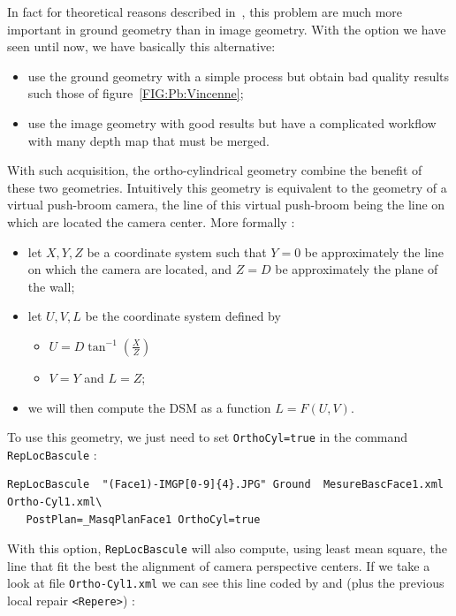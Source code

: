 In fact for theoretical reasons described in~\cite{penard2006reconstruction},
this problem are  much more important in ground geometry than in image geometry.
With the option we have seen until now, we have basically this alternative:

\begin{itemize}
   \item  use the ground geometry with a simple process but obtain bad quality results such those of
          figure~\ref{FIG:Pb:Vincenne};

   \item  use the image geometry with  good results but have a complicated workflow with many depth map
          that must be merged.
\end{itemize}


With such acquisition, the ortho-cylindrical geometry combine the benefit of these
two geometries. Intuitively this geometry is equivalent to the geometry of a virtual push-broom
camera, the line of this virtual push-broom being the line on which are located the
camera center. More formally :


\begin{itemize}
   \item  let  $X,Y,Z$ be a coordinate system such that $Y=0$ be approximately the line on which the camera
          are located, and $Z=D$ be approximately the plane of the wall;

   \item  let  $U,V,L$ be the coordinate system defined by
\begin{itemize}
    \item  $U= D \tan^{-1} (\frac{X}{Z})$
    \item  $V=Y$ and $L=Z$;
\end{itemize}
   \item   we  will then compute the DSM as a function $L= F(U,V)$.
\end{itemize}

To use this geometry, we just need to set {\tt OrthoCyl=true} in the command {\tt RepLocBascule} :

\begin{verbatim}
RepLocBascule  "(Face1)-IMGP[0-9]{4}.JPG" Ground  MesureBascFace1.xml Ortho-Cyl1.xml\
   PostPlan=_MasqPlanFace1 OrthoCyl=true
\end{verbatim}

With this option, {\tt RepLocBascule} will also compute, using least mean square,
the line that fit the best the alignment of camera perspective centers. If we take
a look at file {\tt Ortho-Cyl1.xml} we can see  this line coded by {\tt <P0>}
and {\tt <P1>}  (plus the previous local repair  {\tt <Repere>}) :


